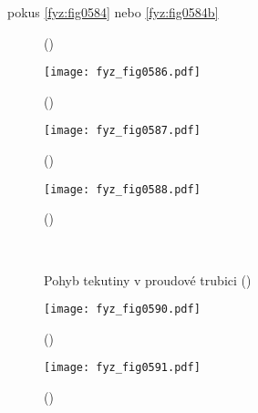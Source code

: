     pokus \ref{fyz:fig0584} nebo \ref{fyz:fig0584b}
    
    \begin{figure}[ht!]
      \centering
      \label{fyz:fig0585}
      \caption{
               (\cite[s.~748]{Feynman02})}
    \end{figure}

    \begin{figure}[ht!] %
      \centering
      \texttt{[image: fyz\_fig0586.pdf]}
      \caption{
               (\cite[s.~707]{Feynman02})}
      \label{fyz:fig0586}
    \end{figure}
    
    \begin{figure}[ht!] %
      \centering
      \texttt{[image: fyz\_fig0587.pdf]}
      \caption{
               (\cite[s.~707]{Feynman02})}
      \label{fyz:fig0587}
    \end{figure}

    \begin{figure}[ht!] %
      \centering
      \texttt{[image: fyz\_fig0588.pdf]}
      \caption{
               (\cite[s.~707]{Feynman02})}
      \label{fyz:fig0588}
    \end{figure}

    \begin{figure}[ht!]
      \centering
                     \\
      \caption{Pohyb tekutiny v proudové trubici
               (\cite[s.~748]{Feynman02})}
    \end{figure}

    \begin{figure}[ht!] %
      \centering
      \texttt{[image: fyz\_fig0590.pdf]}
      \caption{
               (\cite[s.~707]{Feynman02})}
      \label{fyz:fig0590}
    \end{figure}
    
    \begin{figure}[ht!] %
      \centering
      \texttt{[image: fyz\_fig0591.pdf]}
      \caption{
               (\cite[s.~707]{Feynman02})}
      \label{fyz:fig0591}
    \end{figure}

